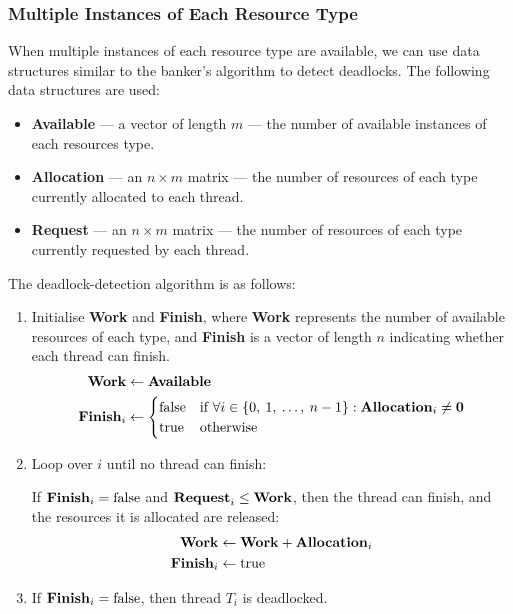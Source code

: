 \documentclass{article}
\begin{document}
\subsubsection{Multiple Instances of Each Resource Type}
When multiple instances of each resource type are available, we can use
data structures similar to the banker's algorithm to detect deadlocks.
The following data structures are used:
\begin{itemize}
    \item \textbf{Available} --- a vector of length \(m\) --- the number of available instances of each resources type.
    \item \textbf{Allocation} --- an \(n \times m\) matrix --- the
          number of resources of each type currently allocated to each
          thread.
    \item \textbf{Request} --- an \(n \times m\) matrix --- the
          number of resources of each type currently requested by each
          thread.
\end{itemize}
The deadlock-detection algorithm is as follows:
\begin{enumerate}
    \item Initialise \textbf{Work} and \textbf{Finish}, where
          \textbf{Work} represents the number of available resources of
          each type, and \textbf{Finish} is a vector of length \(n\)
          indicating whether each thread can finish.
          \begin{align*}
              \text{\textbf{Work}}     & \gets \text{\textbf{Available}}                                                                                                           \\
              \text{\textbf{Finish}}_i & \gets
                                               \begin{cases}
                                                   \text{false} & \text{if } \forall i \in \left\{ 0,\: 1,\: \ldots,\: n-1 \right\} : \text{\textbf{Allocation}}_i \neq \textbf{0} \\
                                                   \text{true}  & \text{otherwise}
                                               \end{cases}
          \end{align*}
    \item Loop over \(i\) until no thread can finish:

          If \(\text{\textbf{Finish}}_i = \text{false}\) and
          \(\text{\textbf{Request}}_i \leq \text{\textbf{Work}}\), then
          the thread can finish, and the resources it is allocated are
          released:
          \begin{align*}
              \text{\textbf{Work}}     & \gets \text{\textbf{Work}} + \text{\textbf{Allocation}}_i \\
              \text{\textbf{Finish}}_i & \gets \text{true}
          \end{align*}
    \item If \(\text{\textbf{Finish}}_i = \text{false}\), then thread
          \(T_i\) is deadlocked.
\end{enumerate}
\end{document}
